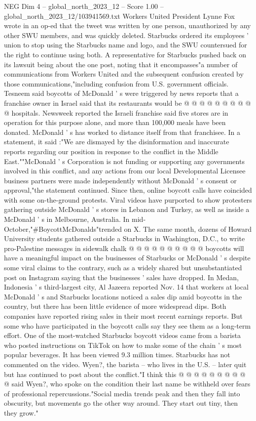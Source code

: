 \begin{textsample}{NEG Dim 4 – global\_north\_2023\_12 – Score 1.00 – global\_north\_2023\_12/103941569.txt}
Workers United President Lynne Fox wrote in an op-ed that the tweet was written by one person, unauthorized by any other SWU members, and was quickly deleted.
Starbucks ordered its employees ' union to stop using the Starbucks name and logo, and the SWU countersued for the right to continue using both.
A representative for Starbucks pushed back on its lawsuit being about the one post, noting that it encompasses"a number of communications from Workers United and the subsequent confusion created by those communications,"including confusion from U.S. government officials.
Tesneem said boycotts of McDonald ' s were triggered by news reports that a franchise owner in Israel said that its restaurants would be @ @ @ @ @ @ @ @ @ @ hospitals.
Newsweek reported the Israeli franchise said five stores are in operation for this purpose alone, and more than 100,000 meals have been donated.
McDonald ' s has worked to distance itself from that franchisee.
In a statement, it said :"We are dismayed by the disinformation and inaccurate reports regarding our position in response to the conflict in the Middle East.""McDonald ' s Corporation is not funding or supporting any governments involved in this conflict, and any actions from our local Developmental Licensee business partners were made independently without McDonald ' s consent or approval,"the statement continued.
Since then, online boycott calls have coincided with some on-the-ground protests.
Viral videos have purported to show protesters gathering outside McDonald ' s stores in Lebanon and Turkey, as well as inside a McDonald ' s in Melbourne, Australia.
In mid-October,"\#BoycottMcDonalds"trended on X.
The same month, dozens of Howard University students gathered outside a Starbucks in Washington, D.C., to write pro-Palestine messages in sidewalk chalk @ @ @ @ @ @ @ @ @ @ boycotts will have a meaningful impact on the businesses of Starbucks or McDonald ' s despite some viral claims to the contrary, such as a widely shared but unsubstantiated post on Instagram saying that the businesses ' sales have dropped.
In Medan, Indonesia ' s third-largest city, Al Jazeera reported Nov. 14 that workers at local McDonald ' s and Starbucks locations noticed a sales dip amid boycotts in the country, but there has been little evidence of more widespread dips.
Both companies have reported rising sales in their most recent earnings reports.
But some who have participated in the boycott calls say they see them as a long-term effort.
One of the most-watched Starbucks boycott videos came from a barista who posted instructions on TikTok on how to make some of the chain ' s most popular beverages.
It has been viewed 9.3 million times.
Starbucks has not commented on the video.
Wyen?, the barista -- who lives in the U.S. -- later quit but has continued to post about the conflict."I think this @ @ @ @ @ @ @ @ @ @ said Wyen?, who spoke on the condition their last name be withheld over fears of professional repercussions."Social media trends peak and then they fall into obscurity, but movements go the other way around.
They start out tiny, then they grow."

\end{textsample}
